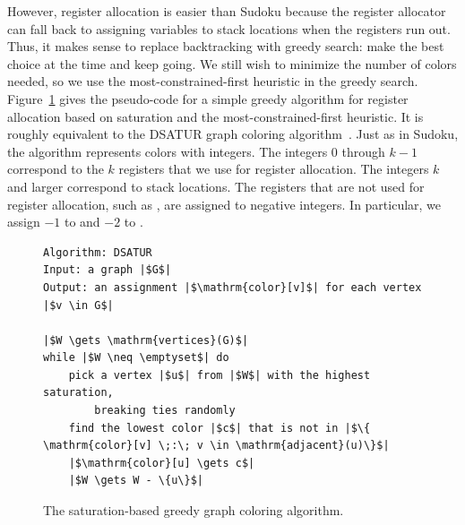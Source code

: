 \documentclass[7x10,nocrop]{TimesAPriori_MIT}%
\begin{document}
However, register allocation is easier than Sudoku because the
register allocator can fall back to assigning variables to stack
locations when the registers run out. Thus, it makes sense to replace
backtracking with greedy search: make the best choice at the time and
keep going. We still wish to minimize the number of colors needed, so
we use the most-constrained-first heuristic in the greedy search.
Figure~\ref{fig:satur-algo} gives the pseudo-code for a simple greedy
algorithm for register allocation based on saturation and the
most-constrained-first heuristic. It is roughly equivalent to the
DSATUR graph coloring algorithm~\citep{Brelaz:1979eu}.
Just as in Sudoku, the algorithm represents colors with integers. The
integers $0$ through $k-1$ correspond to the $k$ registers that we use
for register allocation. The integers $k$ and larger correspond to
stack locations. The registers that are not used for register
allocation, such as , are assigned to negative integers. In
particular, we assign $-1$ to  and $-2$ to .



\begin{figure}[btp]
  \centering
\begin{lstlisting}[basicstyle=\rmfamily,deletekeywords={for,from,with,is,not,in,find},morekeywords={while},columns=fullflexible]
Algorithm: DSATUR
Input: a graph |$G$|
Output: an assignment |$\mathrm{color}[v]$| for each vertex |$v \in G$|

|$W \gets \mathrm{vertices}(G)$|
while |$W \neq \emptyset$| do
    pick a vertex |$u$| from |$W$| with the highest saturation,
        breaking ties randomly
    find the lowest color |$c$| that is not in |$\{ \mathrm{color}[v] \;:\; v \in \mathrm{adjacent}(u)\}$|
    |$\mathrm{color}[u] \gets c$|
    |$W \gets W - \{u\}$|
\end{lstlisting}
  \caption{The saturation-based greedy graph coloring algorithm.}
  \label{fig:satur-algo}
\end{figure}
\end{document}
